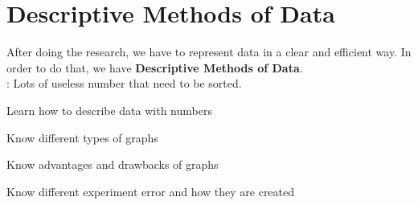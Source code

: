 \section{Descriptive Methods of Data}
After doing the research, we have to represent data in a clear and efficient way. In order to do that, we have \textbf{Descriptive Methods of Data}.\\: Lots of useless number that need to be sorted.\\

\begin{objectives}
    \item Learn how to describe data with numbers
    \item Know different types of graphs
    \item Know advantages and drawbacks of graphs
    \item Know different experiment error and how they are created
\end{objectives}
